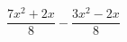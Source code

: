 \begin{ex}
	\begin{condition}
		\( \dfrac{7x^2+2x}{8}-\dfrac{3x^2-2x}{8} \)
	\end{condition}
\end{ex}